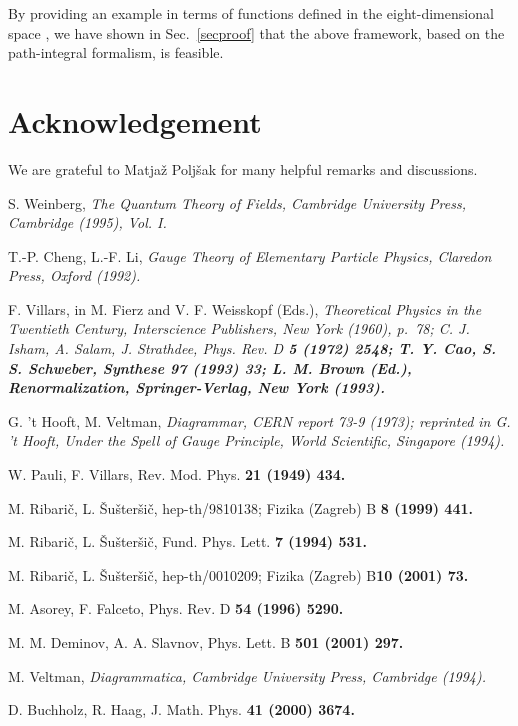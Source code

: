\documentclass[a4paper,12pt]{article}
\providecommand{\RR}{{\rm R}}
\providecommand{\RRRR}{\RR^{1,3}}
\begin{document}
By providing an example in terms of functions defined in the eight-dimensional space \myHighlight{$\RRRR \times \RRRR$}\coordHE{}, we have shown in Sec.~\ref{secproof} that the above framework, based on the path-integral formalism, is feasible.

\section*{Acknowledgement}

We are grateful to Matja\v z Polj\v sak for many helpful remarks and discussions.

\vfill\eject
\begin{thebibliography}{99}

S. Weinberg, \it The Quantum Theory of Fields, \rm Cambridge University Press, Cambridge (1995), Vol. I.

T.-P. Cheng, L.-F. Li, \it Gauge Theory of Elementary Particle Physics, \rm Claredon Press, Oxford (1992).

F. Villars, in M. Fierz and V. F. Weisskopf (Eds.), \it Theoretical Physics in the Twentieth Century, \rm Interscience Publishers, New York (1960), p.~78; C. J. Isham, A. Salam, J. Strathdee, Phys. Rev. D \bf 5 \rm (1972) 2548;  T. Y. Cao, S. S. Schweber, Synthese \bf 97 \rm (1993) 33; L. M. Brown (Ed.), \it Renormalization, \rm Springer-Verlag, New York (1993).

G. 't Hooft, M. Veltman, \it Diagrammar, \rm CERN report 73-9 (1973); reprinted in G. 't Hooft, \it Under the Spell of  Gauge Principle, \rm World Scientific, Singapore (1994).

W. Pauli, F. Villars, Rev. Mod. Phys. \bf 21 \rm (1949) 434.

M. Ribari\v c, L. \v Su\v ster\v si\v c, hep-th/9810138; Fizika (Zagreb) B \bf 8 \rm (1999) 441.

M. Ribari\v c, L. \v Su\v ster\v si\v c, Fund. Phys. Lett. \bf 7 \rm (1994) 531.

M. Ribari\v c, L. \v Su\v ster\v si\v c, hep-th/0010209; Fizika (Zagreb) B\bf 10 \rm (2001) 73.

M. Asorey, F. Falceto, Phys. Rev. D \bf 54 \rm (1996) 5290.

M. M. Deminov, A. A. Slavnov, Phys. Lett. B \bf 501 \rm (2001) 297.

M. Veltman, \it Diagrammatica, \rm Cambridge University Press, Cambridge (1994).

D. Buchholz, R. Haag, J. Math. Phys. \bf 41 \rm (2000) 3674.

\end{thebibliography}
\end{document}
